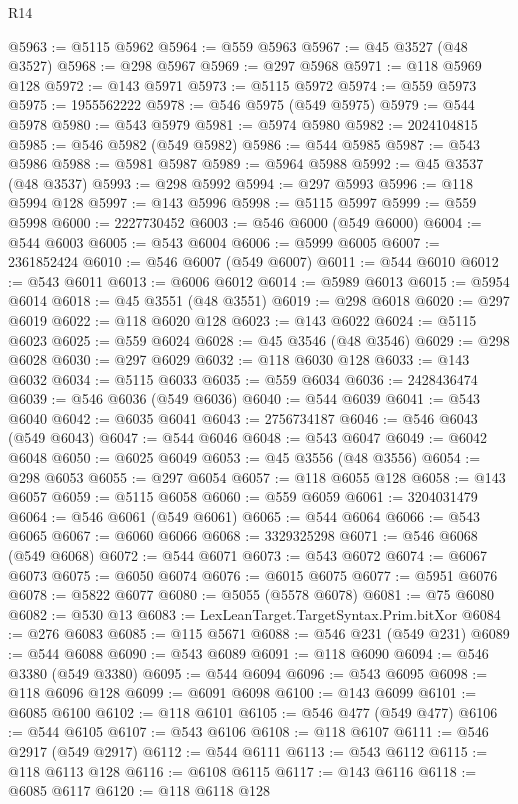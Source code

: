 \begin{lexlean}{R14}
\begin{coremodule}
{{{{{{{{{{{{{{{{{{{{{{{{{{{{{{{{{{{{{{{{{{{{{{{{{{{{{{{{{{{{{{{{{{{{{{{{{{{{{{{{{{@5963 := @5115 @5962
@5964 := @559 @5963
@5967 := @45 @3527 (@48 @3527)
@5968 := @298 @5967
@5969 := @297 @5968
@5971 := @118 @5969 @128
@5972 := @143 @5971
@5973 := @5115 @5972
@5974 := @559 @5973
@5975 := 1955562222
@5978 := @546 @5975 (@549 @5975)
@5979 := @544 @5978
@5980 := @543 @5979
@5981 := @5974 @5980
@5982 := 2024104815
@5985 := @546 @5982 (@549 @5982)
@5986 := @544 @5985
@5987 := @543 @5986
@5988 := @5981 @5987
@5989 := @5964 @5988
@5992 := @45 @3537 (@48 @3537)
@5993 := @298 @5992
@5994 := @297 @5993
@5996 := @118 @5994 @128
@5997 := @143 @5996
@5998 := @5115 @5997
@5999 := @559 @5998
@6000 := 2227730452
@6003 := @546 @6000 (@549 @6000)
@6004 := @544 @6003
@6005 := @543 @6004
@6006 := @5999 @6005
@6007 := 2361852424
@6010 := @546 @6007 (@549 @6007)
@6011 := @544 @6010
@6012 := @543 @6011
@6013 := @6006 @6012
@6014 := @5989 @6013
@6015 := @5954 @6014
@6018 := @45 @3551 (@48 @3551)
@6019 := @298 @6018
@6020 := @297 @6019
@6022 := @118 @6020 @128
@6023 := @143 @6022
@6024 := @5115 @6023
@6025 := @559 @6024
@6028 := @45 @3546 (@48 @3546)
@6029 := @298 @6028
@6030 := @297 @6029
@6032 := @118 @6030 @128
@6033 := @143 @6032
@6034 := @5115 @6033
@6035 := @559 @6034
@6036 := 2428436474
@6039 := @546 @6036 (@549 @6036)
@6040 := @544 @6039
@6041 := @543 @6040
@6042 := @6035 @6041
@6043 := 2756734187
@6046 := @546 @6043 (@549 @6043)
@6047 := @544 @6046
@6048 := @543 @6047
@6049 := @6042 @6048
@6050 := @6025 @6049
@6053 := @45 @3556 (@48 @3556)
@6054 := @298 @6053
@6055 := @297 @6054
@6057 := @118 @6055 @128
@6058 := @143 @6057
@6059 := @5115 @6058
@6060 := @559 @6059
@6061 := 3204031479
@6064 := @546 @6061 (@549 @6061)
@6065 := @544 @6064
@6066 := @543 @6065
@6067 := @6060 @6066
@6068 := 3329325298
@6071 := @546 @6068 (@549 @6068)
@6072 := @544 @6071
@6073 := @543 @6072
@6074 := @6067 @6073
@6075 := @6050 @6074
@6076 := @6015 @6075
@6077 := @5951 @6076
@6078 := @5822 @6077
@6080 := @5055 (@5578 @6078)
@6081 := @75 @6080
@6082 := @530 @13
@6083 := LexLeanTarget.TargetSyntax.Prim.bitXor
@6084 := @276 @6083
@6085 := @115 @5671
@6088 := @546 @231 (@549 @231)
@6089 := @544 @6088
@6090 := @543 @6089
@6091 := @118 @6090
@6094 := @546 @3380 (@549 @3380)
@6095 := @544 @6094
@6096 := @543 @6095
@6098 := @118 @6096 @128
@6099 := @6091 @6098
@6100 := @143 @6099
@6101 := @6085 @6100
@6102 := @118 @6101
@6105 := @546 @477 (@549 @477)
@6106 := @544 @6105
@6107 := @543 @6106
@6108 := @118 @6107
@6111 := @546 @2917 (@549 @2917)
@6112 := @544 @6111
@6113 := @543 @6112
@6115 := @118 @6113 @128
@6116 := @6108 @6115
@6117 := @143 @6116
@6118 := @6085 @6117
@6120 := @118 @6118 @128
}}}}}}}}}}}}}}}}}}}}}}}}}}}}}}}}}}}}}}}}}}}}}}}}}}}}}}}}}}}}}}}}}}}}}}}}}}}}}}}}}}
\end{coremodule}
\end{lexlean}
